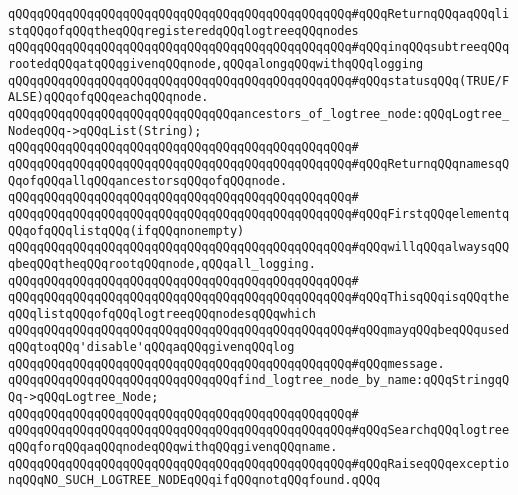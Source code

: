 \verb|qQQqqQQqqQQqqQQqqQQqqQQqqQQqqQQqqQQqqQQqqQQqqQQq#qQQqReturnqQQqaqQQqlistqQQqofqQQqtheqQQqregisteredqQQqlogtreeqQQqnodes|\newline
\verb|qQQqqQQqqQQqqQQqqQQqqQQqqQQqqQQqqQQqqQQqqQQqqQQq#qQQqinqQQqsubtreeqQQqrootedqQQqatqQQqgivenqQQqnode,qQQqalongqQQqwithqQQqlogging|\newline
\verb|qQQqqQQqqQQqqQQqqQQqqQQqqQQqqQQqqQQqqQQqqQQqqQQq#qQQqstatusqQQq(TRUE/FALSE)qQQqofqQQqeachqQQqnode.|\newline
\newline
\verb|qQQqqQQqqQQqqQQqqQQqqQQqqQQqqQQqancestors_of_logtree_node:qQQqLogtree_NodeqQQq->qQQqList(String);|\newline
\verb|qQQqqQQqqQQqqQQqqQQqqQQqqQQqqQQqqQQqqQQqqQQqqQQq#|\newline
\verb|qQQqqQQqqQQqqQQqqQQqqQQqqQQqqQQqqQQqqQQqqQQqqQQq#qQQqReturnqQQqnamesqQQqofqQQqallqQQqancestorsqQQqofqQQqnode.|\newline
\verb|qQQqqQQqqQQqqQQqqQQqqQQqqQQqqQQqqQQqqQQqqQQqqQQq#|\newline
\verb|qQQqqQQqqQQqqQQqqQQqqQQqqQQqqQQqqQQqqQQqqQQqqQQq#qQQqFirstqQQqelementqQQqofqQQqlistqQQq(ifqQQqnonempty)|\newline
\verb|qQQqqQQqqQQqqQQqqQQqqQQqqQQqqQQqqQQqqQQqqQQqqQQq#qQQqwillqQQqalwaysqQQqbeqQQqtheqQQqrootqQQqnode,qQQqall_logging.|\newline
\verb|qQQqqQQqqQQqqQQqqQQqqQQqqQQqqQQqqQQqqQQqqQQqqQQq#|\newline
\verb|qQQqqQQqqQQqqQQqqQQqqQQqqQQqqQQqqQQqqQQqqQQqqQQq#qQQqThisqQQqisqQQqtheqQQqlistqQQqofqQQqlogtreeqQQqnodesqQQqwhich|\newline
\verb|qQQqqQQqqQQqqQQqqQQqqQQqqQQqqQQqqQQqqQQqqQQqqQQq#qQQqmayqQQqbeqQQqusedqQQqtoqQQq'disable'qQQqaqQQqgivenqQQqlog|\newline
\verb|qQQqqQQqqQQqqQQqqQQqqQQqqQQqqQQqqQQqqQQqqQQqqQQq#qQQqmessage.|\newline
\newline
\verb|qQQqqQQqqQQqqQQqqQQqqQQqqQQqqQQqfind_logtree_node_by_name:qQQqStringqQQq->qQQqLogtree_Node;|\newline
\verb|qQQqqQQqqQQqqQQqqQQqqQQqqQQqqQQqqQQqqQQqqQQqqQQq#|\newline
\verb|qQQqqQQqqQQqqQQqqQQqqQQqqQQqqQQqqQQqqQQqqQQqqQQq#qQQqSearchqQQqlogtreeqQQqforqQQqaqQQqnodeqQQqwithqQQqgivenqQQqname.|\newline
\verb|qQQqqQQqqQQqqQQqqQQqqQQqqQQqqQQqqQQqqQQqqQQqqQQq#qQQqRaiseqQQqexceptionqQQqNO_SUCH_LOGTREE_NODEqQQqifqQQqnotqQQqfound.qQQq|\newline
